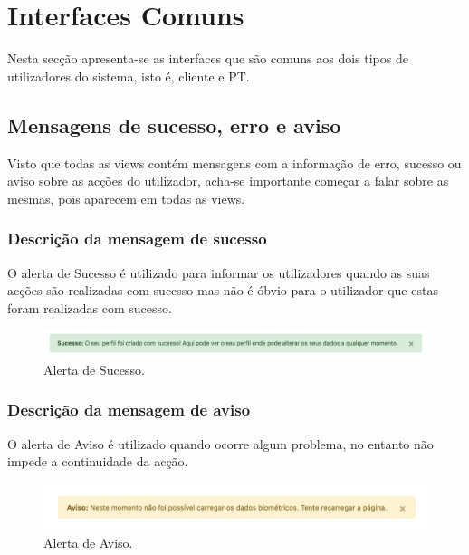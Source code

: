 \section{Interfaces Comuns}
\label{sec:mockupscomuns}
\hspace{5mm} Nesta secção apresenta-se as interfaces que são comuns aos dois tipos de utilizadores do sistema, isto é, cliente e PT.

\subsection{Mensagens de sucesso, erro e aviso}
\label{subsec:sucesso}
\hspace{5mm} Visto que todas as views contém mensagens com a informação de erro, sucesso ou aviso sobre as acções do utilizador, acha-se importante começar a falar sobre as mesmas, pois aparecem em todas as views.

\subsubsection{Descrição da mensagem de sucesso}
\hspace{5mm} O alerta de Sucesso é utilizado para informar os utilizadores quando as suas acções são realizadas com sucesso mas não é óbvio para o utilizador que estas foram realizadas com sucesso.

\begin{figure}[H]
    \centering
    \includegraphics[scale=0.45]{images/alerts/alerta_sucesso.png}
    \caption{Alerta de Sucesso.}
    \label{fig:alertasucesso}
\end{figure}

\subsubsection{Descrição da mensagem de aviso}
\hspace{5mm} O alerta de Aviso é utilizado quando ocorre algum problema, no entanto não impede a continuidade da acção.

\begin{figure}[H]
    \centering
    \includegraphics[scale=0.65]{images/alerts/alerta_aviso.png}
    \caption{Alerta de Aviso.}
    \label{fig:alertaaviso}
\end{figure}

